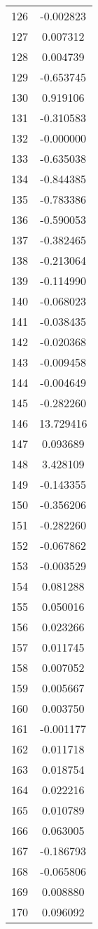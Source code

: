 \documentclass[12pt]{article}
\begin{document}
\begin{longtable}{@{}cc@{}}
126 & -0.002823 \\
127 & 0.007312 \\
128 & 0.004739 \\
129 & -0.653745 \\
130 & 0.919106 \\
131 & -0.310583 \\
132 & -0.000000 \\
133 & -0.635038 \\
134 & -0.844385 \\
135 & -0.783386 \\
136 & -0.590053 \\
137 & -0.382465 \\
138 & -0.213064 \\
139 & -0.114990 \\
140 & -0.068023 \\
141 & -0.038435 \\
142 & -0.020368 \\
143 & -0.009458 \\
144 & -0.004649 \\
145 & -0.282260 \\
146 & 13.729416 \\
147 & 0.093689 \\
148 & 3.428109 \\
149 & -0.143355 \\
150 & -0.356206 \\
151 & -0.282260 \\
152 & -0.067862 \\
153 & -0.003529 \\
154 & 0.081288 \\
155 & 0.050016 \\
156 & 0.023266 \\
157 & 0.011745 \\
158 & 0.007052 \\
159 & 0.005667 \\
160 & 0.003750 \\
161 & -0.001177 \\
162 & 0.011718 \\
163 & 0.018754 \\
164 & 0.022216 \\
165 & 0.010789 \\
166 & 0.063005 \\
167 & -0.186793 \\
168 & -0.065806 \\
169 & 0.008880 \\
170 & 0.096092 \\

\end{longtable}
\end{document}
